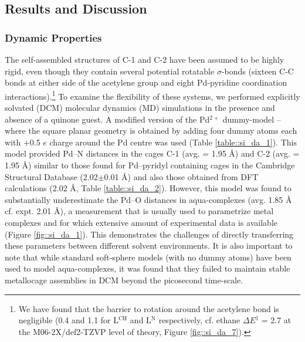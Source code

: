 \documentclass[../../main.tex]{subfiles}
\begin{document}
\subsection{Results and Discussion}

\subsubsection{Dynamic Properties} 

The self-assembled structures of C-1 and C-2 have been assumed to be highly rigid, even though they contain several potential rotatable $\sigma$-bonds (sixteen C-C bonds at either side of the acetylene group and eight Pd-pyridine coordination interactions).\footnote{We have found that the barrier to rotation around the acetylene bond is negligible (0.4 and 1.1 \kcalx for L${}^\text{CH}$ and L${}^\text{N}$ respectively, cf. ethane $\Delta E^\ddagger$ = 2.7 \kcalx at the M06-2X/def2-TZVP level of theory, Figure \ref{fig::si_da_7}).} To examine the flexibility of these systems, we performed explicitly solvated (DCM) molecular dynamics (MD) simulations in the presence and absence of a quinone guest. A modified version of the Pd${}^{2+}$ dummy-model – where the square planar geometry is obtained by adding four dummy atoms each with +0.5 $e$ charge around the Pd centre was used (Table \ref{table::si_da_1}).\cite{Duarte2014} This model provided Pd–N distances in the cages C-1 (avg. = 1.95 \AA) and C-2 (avg. = 1.95 \AA) similar to those found for Pd–pyridyl containing cages in the Cambridge Structural Database (2.02$\pm$0.01 \AA)\cite{Lewis2012, August2016} and also those obtained from DFT calculations (2.02 \AA, Table \ref{table::si_da_2}). However, this model was found to substantially underestimate the Pd–O distances in aqua-complexes (avg. 1.85 \AA$\;$ cf. expt.\cite{Persson2010} 2.01 \AA), a measurement that is usually used to parametrize metal complexes and for which extensive amount of experimental data is available (Figure \ref{fig::si_da_1}).\cite{Li2017} This demonstrates the challenges of directly transferring these parameters between different solvent environments. It is also important to note that while standard soft-sphere models (with no dummy atoms) have been used to model aqua-complexes, it was found that they failed to maintain stable metallocage assemblies in DCM beyond the picosecond time-scale. 
\end{document}
